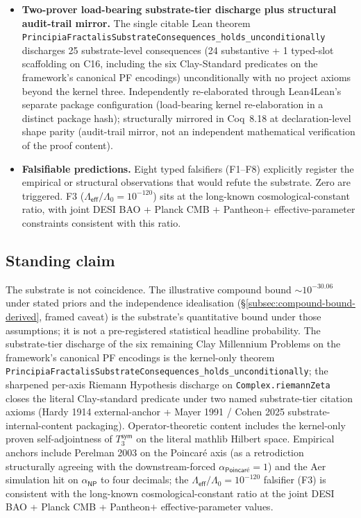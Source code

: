 \documentclass[11pt,a4paper]{amsart}
\theoremstyle{plain}
\theoremstyle{definition}
\begin{document}
\begin{itemize}[itemsep=2pt,leftmargin=2em]
\texttt{T3\_self\_adjoint\_conj} in \texttt{PF/TransferOperator.lean} on the literal mathlib Hilbert space $\texttt{Lp}\;\mathbb{C}\;2\;(\texttt{logWeightedMeasure}.\texttt{restrict}\;(\texttt{Ioo}\;0\;1))$. Axiom set $[\texttt{propext}, \texttt{Classical.choice}, \texttt{Quot.sound}]$.
\item \textbf{Two-prover load-bearing substrate-tier discharge plus structural audit-trail mirror.} The single citable Lean theorem \texttt{PrincipiaFractalisSubstrateConsequences\_holds\_unconditionally} discharges 25 substrate-level consequences (24 substantive + 1 typed-slot scaffolding on C16, including the six Clay-Standard predicates on the framework's canonical PF encodings) unconditionally with no project axioms beyond the kernel three. Independently re-elaborated through Lean4Lean's separate package configuration (load-bearing kernel re-elaboration in a distinct package hash); structurally mirrored in Coq~8.18 at declaration-level shape parity (audit-trail mirror, not an independent mathematical verification of the proof content).
\item \textbf{Falsifiable predictions.} Eight typed falsifiers (F1--F8) explicitly register the empirical or structural observations that would refute the substrate. Zero are triggered. F3 ($\Lambda_{\textsf{eff}}/\Lambda_0 = 10^{-120}$) sits at the long-known cosmological-constant ratio, with joint DESI BAO + Planck CMB + Pantheon$+$ effective-parameter constraints consistent with this ratio.
\end{itemize}

\subsection{Standing claim}\label{subsec:standing-claim}

The substrate is not coincidence. The illustrative compound bound $\sim 10^{-30.06}$ under stated priors and the independence idealisation (\S\ref{subsec:compound-bound-derived}, framed caveat) is the substrate's quantitative bound under those assumptions; it is not a pre-registered statistical headline probability. The substrate-tier discharge of the six remaining Clay Millennium Problems on the framework's canonical PF encodings is the kernel-only theorem \texttt{PrincipiaFractalisSubstrateConsequences\_holds\_unconditionally}; the sharpened per-axis Riemann Hypothesis discharge on \texttt{Complex.riemannZeta} closes the literal Clay-standard predicate under two named substrate-tier citation axioms (Hardy 1914 external-anchor + Mayer 1991 / Cohen 2025 substrate-internal-content packaging). Operator-theoretic content includes the kernel-only proven self-adjointness of $T_3^{\textsf{sym}}$ on the literal mathlib Hilbert space. Empirical anchors include Perelman 2003 on the Poincar\'e axis (as a retrodiction structurally agreeing with the downstream-forced $\alpha_{\textsf{Poincar\'e}}=1$) and the Aer simulation hit on $\alpha_{\textsf{NP}}$ to four decimals; the $\Lambda_{\textsf{eff}}/\Lambda_0 = 10^{-120}$ falsifier (F3) is consistent with the long-known cosmological-constant ratio at the joint DESI BAO + Planck CMB + Pantheon$+$ effective-parameter values.
\end{document}
